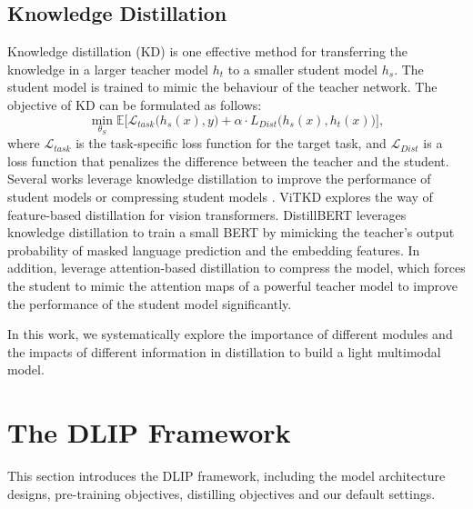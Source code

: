 \documentclass[10pt,twocolumn,letterpaper]{article}
\begin{document}
\subsection{Knowledge Distillation}
Knowledge distillation (KD) \cite{hinton2015distilling, zagoruyko2016paying, park2019relational, beyer2022knowledge} is one effective method for transferring the knowledge in a larger teacher model $ h_t $ to a smaller student model $h_s$. The student model is trained to mimic the behaviour of the teacher network. The objective of KD can be formulated as follows:
\begin{equation}
  \min_{{\theta}_{S}} \mathbb{E} \bigg [ \mathcal{L}_{task} \big(h_{s}(x) , y \big) + \alpha \cdot L_{Dist} \big(h_{s}(x ), h_{t}(x )\big) \bigg ],
\end{equation}
where $\mathcal{L}_{task}$ is the task-specific loss function for the target task, and $ \mathcal{L}_{Dist} $ is a loss function that penalizes the difference between the teacher and the student. 
Several works leverage knowledge distillation to improve the performance of student models or compressing student models \cite{zagoruyko2016paying, li2021align, fang2021compressing, sanh2019distilbert, yang2022vitkd}.
ViTKD \cite{yang2022vitkd} explores the way of feature-based distillation for vision transformers.
DistillBERT \cite{sanh2019distilbert} leverages knowledge distillation to train a small BERT by mimicking the teacher’s output probability of masked language prediction and the embedding features.
In addition, \cite{zagoruyko2016paying, jiao2019tinybert, sun2020mobilebert, fang2021compressing} leverage attention-based distillation to compress the model, which forces the student to mimic the attention maps of a powerful teacher model to improve the performance of the student model significantly. 

In this work, we systematically explore the importance of different modules and the impacts of different information in distillation to  build a light multimodal model.

\section{The DLIP Framework}
This section introduces the DLIP framework, including the model architecture designs, pre-training objectives, distilling objectives and our default settings.
\end{document}

